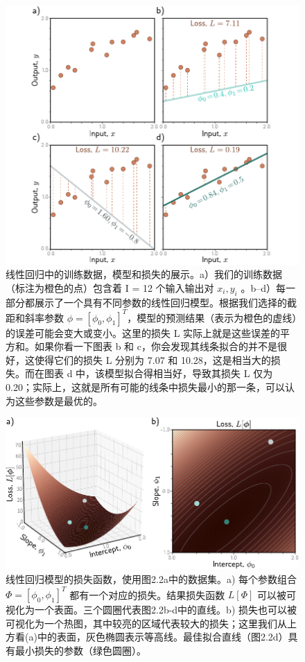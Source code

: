 \documentclass[lang=cn,newtx,10pt,scheme=chinese]{elegantbook}
\begin{document}
\begin{figure}
	\centering
	\includegraphics[width=0.7\linewidth]{PDFFigures/UDLChap2PDF/SupervisedLinearFitError.pdf}
	\caption{线性回归中的训练数据，模型和损失的展示。a）我们的训练数据（标注为橙色的点）包含着 I = 12 个输入输出对 {$x_i , y_i$ }。b–d）每一部分都展示了一个具有不同参数的线性回归模型。根据我们选择的截距和斜率参数 $\phi = [\phi_0 , \phi_1 ]^T$，模型的预测结果（表示为橙色的虚线）的误差可能会变大或变小。这里的损失 L 实际上就是这些误差的平方和。如果你看一下图表 b 和 c，你会发现其线条拟合的并不是很好，这使得它们的损失 L 分别为 7.07 和 10.28，这是相当大的损失。而在图表 d 中，该模型拟合得相当好，导致其损失 L 仅为 0.20；实际上，这就是所有可能的线条中损失最小的那一条，可以认为这些参数是最优的。}

\end{figure}

\begin{figure}
	\centering
	\includegraphics[width=0.7\linewidth]{PDFFigures/UDLChap2PDF/SupervisedSurface.pdf}
	\caption{线性回归模型的损失函数，使用图2.2a中的数据集。a) 每个参数组合 $\Phi = [\phi_0, \phi_1]^T$ 都有一个对应的损失。结果损失函数 $L[\Phi]$ 可以被可视化为一个表面。三个圆圈代表图2.2b-d中的直线。b) 损失也可以被可视化为一个热图，其中较亮的区域代表较大的损失；这里我们从上方看(a)中的表面，灰色椭圆表示等高线。最佳拟合直线（图2.2d）具有最小损失的参数（绿色圆圈）。}
\end{figure}
\end{document}
